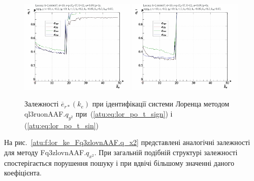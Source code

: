 \begin{figure}[ht!]
  \centerline{
    \includegraphics[width=0.49\textwidth]{p/cha/lor/ql3ruonAAF/lor_ql3ruonAAF_qy2-p_k_e_e_sign.png}
    \hfill
    \includegraphics[width=0.49\textwidth]{p/cha/lor/ql3ruonAAF/lor_ql3ruonAAF_qy2-p_k_e_e_sin.png}
  }
\caption{Залежності $ \overline{e}_{r *} (k_e) $ при ідентифікації системи Лоренца методом ql3ruonAAF.$q_{y^2} $ при~(\ref{atu:eq:lor_po_t_sign}) і (\ref{atu:eq:lor_po_t_sin})}
\label{atu:f:lor_ke_ql3ruonAAF.q_y2}
\end{figure}

На рис.~\ref{atu:f:lor_ke_Fq3zlovnAAF.q_x2} представлені аналогічні залежності
для методу Fq3zlovnAAF.$q_{x^2} $. При загальній подібній структурі залежності
спостерігається порушення пошуку і при вдвічі більшому значенні
даного коефіцієнта.

